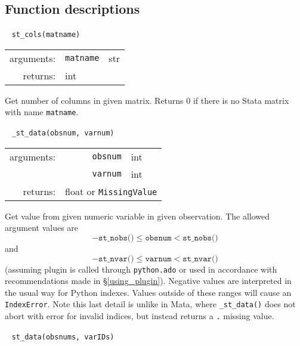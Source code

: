 \documentclass{article}
\begin{document}
\subsection{Function descriptions} \label{func_descript}
			
			
			\ \newline
			\noindent \lstinline$st_cols(matname)$
								
			\vspace{1.5mm}
			\noindent 
			\indent \begin{tabular}{rrl}
					arguments: & \texttt{matname} & str \\
					returns: & \multicolumn{2}{l}{int}
				\end{tabular}
								
			\vspace{1.5mm}
			\noindent Get number of columns in given matrix. Returns 0 if there is no Stata matrix with name \lstinline$matname$. \newline
			
			
			\ \newline
			\noindent \lstinline$_st_data(obsnum, varnum)$
								
			\vspace{1.5mm}
			\noindent 
			\indent \begin{tabular}{rrl}
					arguments: & \texttt{obsnum} & int \\
						& \texttt{varnum} & int \\
					returns: & \multicolumn{2}{l}{float or \lstinline$MissingValue$}
				\end{tabular}
								
			\vspace{1.5mm}
			\noindent Get value from given numeric variable in given observation. The allowed argument values are 
			\[
				-\texttt{st\_nobs()} \leq \texttt{obsnum} < \texttt{st\_nobs()}
			\]
			and
			\[
				-\texttt{st\_nvar()} \leq \texttt{varnum} < \texttt{st\_nvar()}
			\]
			(assuming plugin is called through \lstinline$python.ado$ or used in accordance with recommendations made in \S\ref{using_plugin}). Negative values are interpreted in the usual way for Python indexes. Values outside of these ranges will cause an \lstinline$IndexError$. Note this last detail is unlike in Mata, where \lstinline{_st_data()} does not abort with error for invalid indices, but instead returns a \lstinline{.} missing value.
			\newline
			
			
			\ \newline
			\noindent \lstinline$st_data(obsnums, varIDs)$
								
\end{document}
